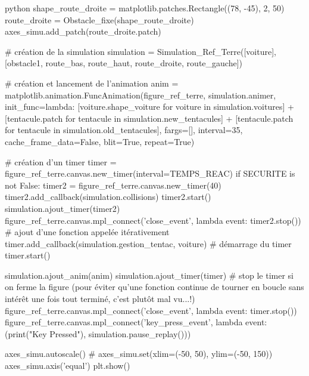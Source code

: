 \begin{mintedbox}{python}
shape_route_droite = matplotlib.patches.Rectangle((78, -45), 2, 50)
route_droite = Obstacle_fixe(shape_route_droite)
axes_simu.add_patch(route_droite.patch)

# création de la simulation
simulation = Simulation_Ref_Terre([voiture], [obstacle1, route_bas, route_haut, route_droite, route_gauche])

# création et lancement de l'animation
anim = matplotlib.animation.FuncAnimation(figure_ref_terre,
                                          simulation.animer,
                                          init_func=lambda: [voiture.shape_voiture for voiture in simulation.voitures] + [tentacule.patch for tentacule in simulation.new_tentacules] + [tentacule.patch for tentacule in simulation.old_tentacules],
                                          fargs=[],
                                          interval=35,
                                          cache_frame_data=False,
                                          blit=True,
                                          repeat=True)

# création d'un timer
timer = figure_ref_terre.canvas.new_timer(interval=TEMPS_REAC)
if SECURITE is not False:
    timer2 = figure_ref_terre.canvas.new_timer(40)
    timer2.add_callback(simulation.collisions)
    timer2.start()
    simulation.ajout_timer(timer2)
    figure_ref_terre.canvas.mpl_connect('close_event', lambda event: timer2.stop())
# ajout d'une fonction appelée itérativement
timer.add_callback(simulation.gestion_tentac, voiture)
# démarrage du timer
timer.start()

simulation.ajout_anim(anim)
simulation.ajout_timer(timer)
# stop le timer si on ferme la figure (pour éviter qu'une fonction continue de tourner en boucle sans intérêt une fois tout terminé, c'est plutôt mal vu...!)
figure_ref_terre.canvas.mpl_connect('close_event', lambda event: timer.stop())
figure_ref_terre.canvas.mpl_connect('key_press_event', lambda event: (print("Key Pressed"), simulation.pause_replay()))

axes_simu.autoscale()
# axes_simu.set(xlim=(-50, 50), ylim=(-50, 150))
axes_simu.axis('equal')
plt.show()

\end{mintedbox}
